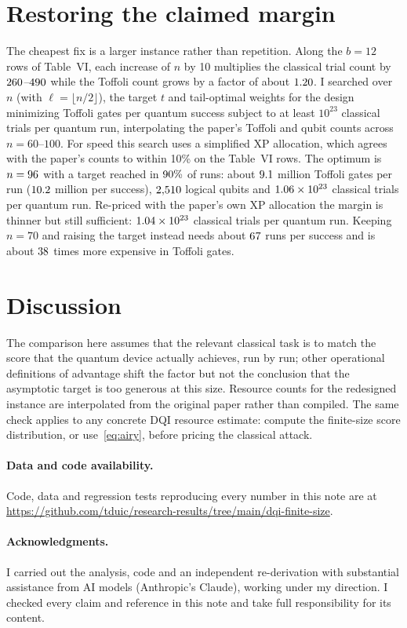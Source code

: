 \documentclass[11pt]{article}
\begin{document}
\section{Restoring the claimed margin}\label{sec:redesign}

The cheapest fix is a larger instance rather than repetition.
Along the $b=12$ rows of Table~VI, each increase of $n$ by 10 multiplies the classical trial count by $260$--$490$ while the Toffoli count grows by a factor of about $1.20$.
I searched over $n$ (with $\ell=\lfloor n/2\rfloor$), the target $t$ and tail-optimal weights for the design minimizing Toffoli gates per quantum success subject to at least $10^{23}$ classical trials per quantum run, interpolating the paper's Toffoli and qubit counts across $n=60$--$100$.
For speed this search uses a simplified XP allocation, which agrees with the paper's counts to within 10\% on the Table~VI rows.
The optimum is $n=96$ with a target reached in $90\%$ of runs: about $9.1$ million Toffoli gates per run ($10.2$ million per success), $2{,}510$ logical qubits and $1.06\times 10^{23}$ classical trials per quantum run. Re-priced with the paper's own XP allocation the margin is thinner but still sufficient: $1.04\times 10^{23}$ classical trials per quantum run.
Keeping $n=70$ and raising the target instead needs about $67$ runs per success and is about $38$ times more expensive in Toffoli gates.

\section{Discussion}

The comparison here assumes that the relevant classical task is to match the score that the quantum device actually achieves, run by run; other operational definitions of advantage shift the factor but not the conclusion that the asymptotic target is too generous at this size.
Resource counts for the redesigned instance are interpolated from the original paper rather than compiled.
The same check applies to any concrete DQI resource estimate: compute the finite-size score distribution, or use~\eqref{eq:airy}, before pricing the classical attack.

\paragraph{Data and code availability.}
Code, data and regression tests reproducing every number in this note are at \url{https://github.com/tduic/research-results/tree/main/dqi-finite-size}.

\paragraph{Acknowledgments.}
I carried out the analysis, code and an independent re-derivation with substantial assistance from AI models (Anthropic's Claude), working under my direction. I checked every claim and reference in this note and take full responsibility for its content.



\end{document}
